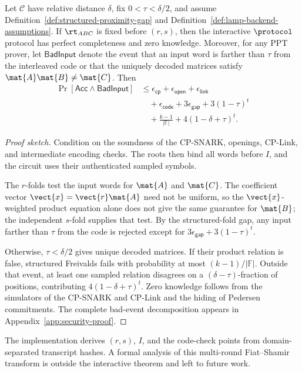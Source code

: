 \begin{theorem}
\label{thm:security}
Let \(\mathcal{C}\) have relative distance \(\delta\), fix
\(0<\tau<\delta/2\), and assume Definition~\ref{def:structured-proximity-gap}
and Definition~\ref{def:lamp-backend-assumptions}.  If \(\rt_{ABC}\) is fixed
before \((r,s)\), then the interactive \(\protocol\) protocol has perfect
completeness and zero knowledge.  Moreover, for any PPT prover, let
\(\mathsf{BadInput}\) denote the event that an input word is farther than
\(\tau\) from the interleaved code or that the uniquely decoded matrices
satisfy \(\mat{A}\mat{B}\ne\mat{C}\).  Then
\[
\begin{aligned}
\Pr[\mathsf{Acc}\land\mathsf{BadInput}]
&\le \epsilon_{\mathsf{cp}}+\epsilon_{\mathsf{open}}
   +\epsilon_{\mathsf{link}}\\
&\quad +\epsilon_{\mathsf{code}}+3\epsilon_{\mathsf{gap}}
   +3(1-\tau)^t\\
&\quad +\frac{k-1}{|\mathbb{F}|}
   +4(1-\delta+\tau)^t .
\end{aligned}
\]
\end{theorem}

\begin{proof}[Proof sketch]
Condition on the soundness of the CP-SNARK, openings, CP-Link, and
intermediate encoding checks.  The roots then bind all words before \(I\), and
the circuit uses their authenticated sampled symbols.

The \(r\)-folds test the input words for \(\mat{A}\) and \(\mat{C}\).  The
coefficient vector \(\vect{x}=\vect{r}\mat{A}\) need not be uniform, so the
\(\vect{x}\)-weighted product equation alone does not give the same guarantee
for \(\mat{B}\); the independent \(s\)-fold supplies that test.  By the
structured-fold gap, any input farther than \(\tau\) from the code is rejected
except for \(3\epsilon_{\mathsf{gap}}+3(1-\tau)^t\).

Otherwise, \(\tau<\delta/2\) gives unique decoded matrices.  If their product
relation is false, structured Freivalds fails with probability at most
\((k-1)/|\mathbb{F}|\).  Outside that event, at least one sampled relation
disagrees on a \((\delta-\tau)\)-fraction of positions, contributing
\(4(1-\delta+\tau)^t\).  Zero knowledge follows from the simulators of the
CP-SNARK and CP-Link and the hiding of Pedersen commitments.  The complete
bad-event decomposition appears in Appendix~\ref{app:security-proof}.
\end{proof}

\begin{remark}
The implementation derives \((r,s)\), \(I\), and the code-check points from
domain-separated transcript hashes.  A formal analysis of this multi-round
Fiat--Shamir transform is outside the interactive theorem and left to future
work.
\end{remark}
